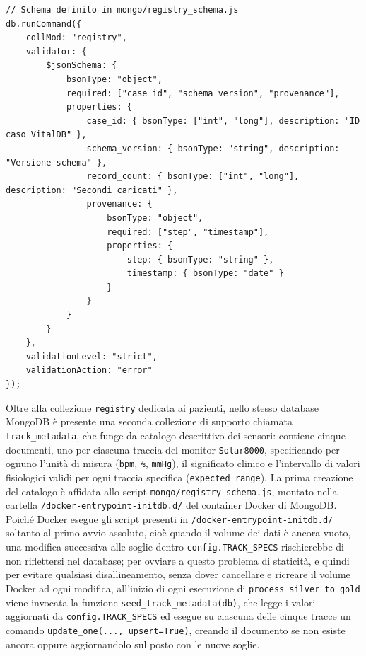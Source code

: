 \vspace{4pt}
\noindent\begin{minipage}{\textwidth}
\begin{lstlisting}
// Schema definito in mongo/registry_schema.js
db.runCommand({
    collMod: "registry",
    validator: {
        $jsonSchema: {
            bsonType: "object",
            required: ["case_id", "schema_version", "provenance"],
            properties: {
                case_id: { bsonType: ["int", "long"], description: "ID caso VitalDB" },
                schema_version: { bsonType: "string", description: "Versione schema" },
                record_count: { bsonType: ["int", "long"], description: "Secondi caricati" },
                provenance: {
                    bsonType: "object",
                    required: ["step", "timestamp"],
                    properties: {
                        step: { bsonType: "string" },
                        timestamp: { bsonType: "date" }
                    }
                }
            }
        }
    },
    validationLevel: "strict",
    validationAction: "error"
});
\end{lstlisting}
\label{lst:registry_schema}
\end{minipage}
\vspace{8pt}

Oltre alla collezione \texttt{registry} dedicata ai pazienti, nello stesso database MongoDB \`e presente una seconda collezione di supporto chiamata \texttt{track\_metadata}, che funge da catalogo descrittivo dei sensori: contiene cinque documenti, uno per ciascuna traccia del monitor \texttt{Solar8000}, specificando per ognuno l'unit\`a di misura (\texttt{bpm}, \texttt{\%}, \texttt{mmHg}), il significato clinico e l'intervallo di valori fisiologici validi per ogni traccia specifica (\texttt{expected\_range}). La prima creazione del catalogo \`e affidata allo script \texttt{mongo/\allowbreak registry\_\allowbreak schema.js}, montato nella cartella \texttt{/docker-entrypoint-initdb.d/} del container Docker di MongoDB.  Poich\'e  Docker esegue gli script presenti in \texttt{/docker-entrypoint-initdb.d/} soltanto al primo avvio assoluto, cio\`e quando il volume dei dati \`e ancora vuoto, una modifica successiva alle soglie dentro \texttt{config.TRACK\_SPECS} rischierebbe di non riflettersi nel database; per ovviare a questo problema di staticit\`a, e quindi per evitare qualsiasi disallineamento, senza dover cancellare e ricreare il volume Docker ad ogni modifica, all'inizio di ogni esecuzione di \texttt{process\_silver\_to\_gold} viene invocata la funzione \texttt{seed\_track\_metadata(db)}, che legge i valori aggiornati da \texttt{config.\allowbreak TRACK\_SPECS} ed esegue su ciascuna delle cinque tracce un comando \texttt{update\_one(..., upsert=True)}, creando il documento se non esiste ancora oppure aggiornandolo sul posto con le nuove soglie.

